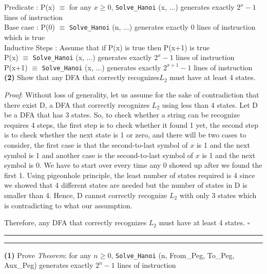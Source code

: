 \documentclass[a4paper, 11pt]{article}
\newcommand{\question}[2] {\vspace{.25in} \hrule\vspace{0.5em}
	\noindent{\bf #1: #2} \vspace{0.5em}
	\hrule \vspace{.10in}}
\renewcommand{\part}[1] {\vspace{.10in} {\bf (#1)}}
\begin{document}
	Predicate : P(x) $\equiv$ for any $x \geq 0$, \texttt{Solve\_Hanoi} (x, ...) generates exactly $2^x-1$ lines of instruction\\
	
	Base case : P(0) $\equiv$ \texttt{Solve\_Hanoi} (n, ...) generates exactly 0 lines of instruction which is true\\
	
	Inductive Steps : Assume that if P(x) is true then P(x+1) is true\\
	P(x)  $\equiv$ \texttt{Solve\_Hanoi} (x, ...) generates exactly $2^x-1$ lines of instruction\\
	P(x+1)  $\equiv$ \texttt{Solve\_Hanoi} (x, ...) generates exactly $2^{x+1}-1$ lines of instruction\\ %
	
	\part{2} Show that any DFA that correctly recognizes$L_2$ must have at least 4 states.
	
	{\em Proof}: Without loss of generality, let us assume for the sake of contradiction that there exist D, a DFA that correctly recognizes $L_2$ using less than 4 states. Let D be a DFA that has 3 states. So, to check whether a string can be recognize requires 4 steps, the first step is to check whether it found 1 yet, the second  step is to check whether the next state is 1 or zero, and there will be two cases to consider, the first case is that the second-to-last symbol of $x$ is 1 and the next symbol is 1 and another case is the second-to-last symbol of $x$ is 1 and the next symbol is 0. We have to start over every time any 0 showed up after we found the first 1. Using pigeonhole principle, the least number of states required is 4 since we showed that 4 different states are needed but the number of states in D is smaller than 4. Hence, D cannot correctly recognize $L_2$ with only 3 states which is contradicting to what our assumption.
	
	Therefore, any DFA that correctly recognizes $L_2$ must have at least 4 states. $\square$
	
	\question{7}{Digit Sum}
	\part{1} Prove {\em Theorem}:
	for any $n \geq 0$, \texttt{Solve\_Hanoi} (n, {From\_Peg}, {To\_Peg}, {Aux\_Peg}) generates exactly $2^n-1$ lines of instruction\\
	
\end{document}
